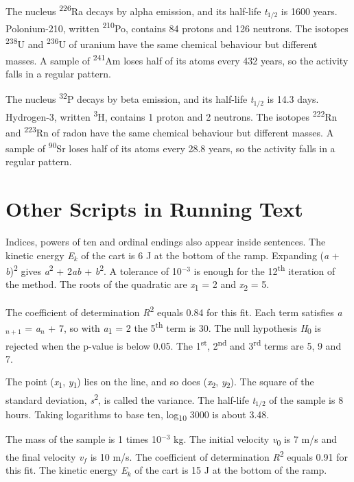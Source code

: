 \documentclass[11pt]{article}
\begin{document}
The nucleus \textsuperscript{226}Ra decays by alpha emission, and its half-life \textit{t}$_{1/2}$ is 1600 years. Polonium-210, written \textsuperscript{210}Po, contains 84 protons and 126 neutrons. The isotopes \textsuperscript{238}U and \textsuperscript{236}U of uranium have the same chemical behaviour but different masses. A sample of \textsuperscript{241}Am loses half of its atoms every 432 years, so the activity falls in a regular pattern.

The nucleus \textsuperscript{32}P decays by beta emission, and its half-life \textit{t}$_{1/2}$ is 14.3 days. Hydrogen-3, written \textsuperscript{3}H, contains 1 proton and 2 neutrons. The isotopes \textsuperscript{222}Rn and \textsuperscript{223}Rn of radon have the same chemical behaviour but different masses. A sample of \textsuperscript{90}Sr loses half of its atoms every 28.8 years, so the activity falls in a regular pattern.
\section*{Other Scripts in Running Text}
Indices, powers of ten and ordinal endings also appear inside sentences.
The kinetic energy \textit{E}$_{k}$ of the cart is 6 J at the bottom of the ramp. Expanding (\textit{a} + \textit{b})\textsuperscript{2} gives \textit{a}\textsuperscript{2} + 2\textit{ab} + \textit{b}\textsuperscript{2}. A tolerance of 10$^{-3}$ is enough for the 12\textsuperscript{th} iteration of the method. The roots of the quadratic are \textit{x}\textsubscript{1} = 2 and \textit{x}\textsubscript{2} = 5.

The coefficient of determination \textit{R}\textsuperscript{2} equals 0.84 for this fit. Each term satisfies \textit{a}$_{n+1}$ = \textit{a}$_{n}$ + 7, so with \textit{a}\textsubscript{1} = 2 the 5\textsuperscript{th} term is 30. The null hypothesis \textit{H}\textsubscript{0} is rejected when the p-value is below 0.05. The 1\textsuperscript{st}, 2\textsuperscript{nd} and 3\textsuperscript{rd} terms are 5, 9 and 7.

The point (\textit{x}\textsubscript{1}, \textit{y}\textsubscript{1}) lies on the line, and so does (\textit{x}\textsubscript{2}, \textit{y}\textsubscript{2}). The square of the standard deviation, \textit{s}\textsuperscript{2}, is called the variance. The half-life \textit{t}$_{1/2}$ of the sample is 8 hours. Taking logarithms to base ten, log\textsubscript{10} 3000 is about 3.48.

The mass of the sample is 1 times 10$^{-3}$ kg. The initial velocity \textit{v}\textsubscript{0} is 7 m/s and the final velocity \textit{v}$_{f}$ is 10 m/s. The coefficient of determination \textit{R}\textsuperscript{2} equals 0.91 for this fit. The kinetic energy \textit{E}$_{k}$ of the cart is 15 J at the bottom of the ramp.
\end{document}
